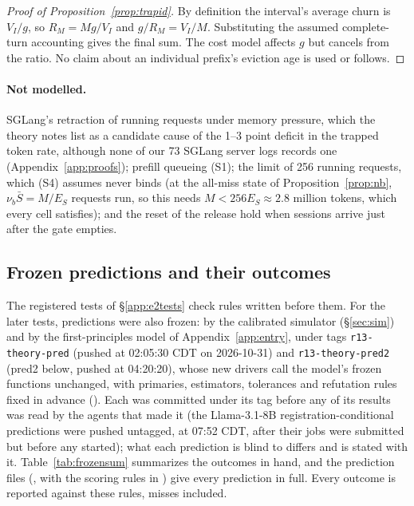 \begin{proof}[Proof of Proposition~\ref{prop:trapid}]
By definition the interval's average churn is $V_I/g$, so $R_M=Mg/V_I$ and $g/R_M=V_I/M$. Substituting the assumed complete-turn accounting gives the final sum. The cost model affects $g$ but cancels from the ratio. No claim about an individual prefix's eviction age is used or follows.
\end{proof}

\paragraph{Not modelled.} SGLang's retraction of running requests under memory pressure, which the theory notes list as a candidate cause of the 1--3 point deficit in the trapped token rate, although none of our 73 SGLang server logs records one (Appendix~\ref{app:proofs}); prefill queueing (S1); the limit of 256 running requests, which (S4) assumes never binds (at the all-miss state of Proposition~\ref{prop:nb}, $\nu_b\bar S=M/E_S$ requests run, so this needs $M<256E_S\approx2.8$ million tokens, which every cell satisfies); and the reset of the release hold when sessions arrive just after the gate empties.

\subsection{Frozen predictions and their outcomes}\label{sec:frozen}

The registered tests of \S\ref{app:e2tests} check rules written before them. For the later tests, predictions were also frozen: by the calibrated simulator (\S\ref{sec:sim}) and by the first-principles model of Appendix~\ref{app:entry}, under tags \texttt{r13-theory-pred} (pushed at 02:05:30 CDT on 2026-10-31) and \texttt{r13-theory-pred2} (pred2 below, pushed at 04:20:20), whose new drivers call the model's frozen functions unchanged, with primaries, estimators, tolerances and refutation rules fixed in advance (). Each was committed under its tag before any of its results was read by the agents that made it (the Llama-3.1-8B registration-conditional predictions were pushed untagged, at 07:52 CDT, after their jobs were submitted but before any started); what each prediction is blind to differs and is stated with it. Table~\ref{tab:frozensum} summarizes the outcomes in hand, and the prediction files (, with the scoring rules in ) give every prediction in full. Every outcome is reported against these rules, misses included.

